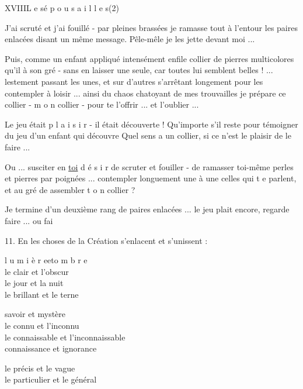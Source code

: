 XVIII\qquad L e s\quad é p o u s a i l l e s\qquad (2)

J'ai scruté et j'ai fouillé - par pleines brassées je ramasse tout à l'entour les paires enlacées disant un même message. Pêle-mêle je les jette devant moi ...

Puis, comme un enfant appliqué intensément enfile collier de pierres multicolores qu'il  à son gré - sans en laisser une seule, car toutes lui semblent belles ! ... lestement passant les unes, et sur d'autres s'arrêtant longement pour les contempler à loisir ... ainsi du chaos chatoyant de mes trouvailles je prépare ce collier - m o n collier - pour te l'offrir ... et  l'oublier ...

Le jeu était p l a i s i r - il était découverte ! Qu'importe s'il reste   pour témoigner du jeu  d'un enfant qui découvre \unsure{!} Quel sens a un collier, si ce n'est le plaisir de le faire ...

Ou ... susciter en \uline{toi} d é s i r de scruter et fouiller - de ramasser toi-même perles et pierres par poignées ... contempler longuement une à une celles qui t e parlent, et au gré de    assembler t o n collier ?


Je termine d'un deuxième rang de paires enlacées ...  le jeu  plait encore,  regarde faire ... ou  fai 

11. En les choses de la Création s'enlacent et s'unissent :

\begin{flushleft}
l u m i è r e\quad et\quad o m b r e\\
le clair et l'obscur\\
le jour et la nuit\\
le brillant et le terne

savoir et mystère\\
le connu et l'inconnu\\
le connaissable et l'inconnaissable\\
connaissance et ignorance

le précis et le vague\\
le particulier et le général
\end{flushleft}


